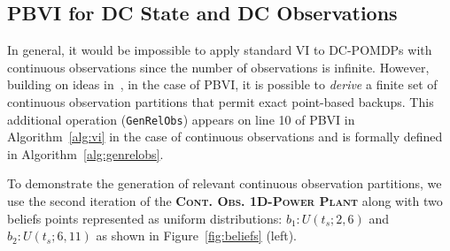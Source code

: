 \documentclass{article} %
\begin{document}
\subsection{PBVI for DC State and DC Observations} 
\label{sec:cont_obs}

In general, it would be impossible to apply standard VI to 
DC-POMDPs with continuous observations since the number of observations
is infinite.  However, building on ideas in~\cite{pascal_ijcai05},
in the case of PBVI, it is possible to \emph{derive} a finite set of
continuous observation partitions that permit exact point-based backups.
This additional operation (\texttt{GenRelObs}) appears on line 10 of PBVI in 
Algorithm~\ref{alg:vi} in the case of continuous observations and is
formally defined in Algorithm~\ref{alg:genrelobs}.

To demonstrate the generation of relevant continuous observation partitions, 
we use the second iteration of the \textsc{\bf Cont. Obs. 1D-Power
  Plant} along with two beliefs points represented as 
uniform distributions: $b_1: U(t_s;2,6)$ and $b_2: U(t_s;6,11)$ as
shown in Figure~\ref{fig:beliefs} (left).
\end{document}
